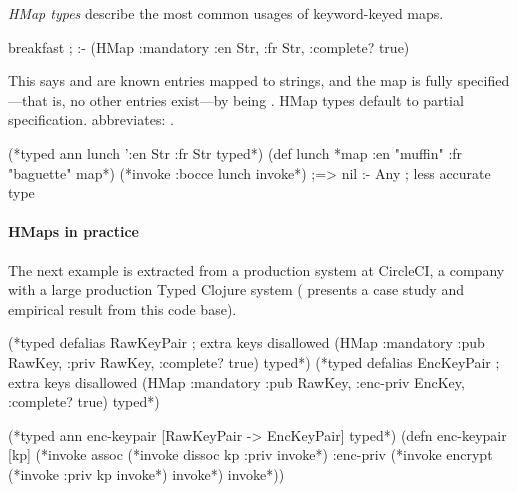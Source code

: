 \emph{HMap types} describe the most common usages of
keyword-keyed maps.

\begin{cljlisting}
breakfast ; :- (HMap :mandatory {:en Str, :fr Str}, :complete? true)
\end{cljlisting}

This says
 and  are known entries mapped to strings,
and the map is fully specified---that is, no other entries exist---by  being .
%
HMap types default to partial specification.
 abbreviates:
.

%
\begin{exmp}
\begin{cljlisting}
(*typed ann lunch '{:en Str :fr Str} typed*)
(def lunch {*map :en "muffin" :fr "baguette" map*})
(*invoke :bocce lunch invoke*) ;=> nil :- Any ; less accurate type
\end{cljlisting}
\label{example:lunchpartial}
\end{exmp}

\paragraph{HMaps in practice} The next example is extracted from a production system at CircleCI,
a company with a large production Typed Clojure system
( presents a case study and empirical
result from this code base).


\begin{minipage}{\linewidth}
\begin{exmp}
\begin{cljlisting}
(*typed defalias RawKeyPair ; extra keys disallowed
  (HMap :mandatory {:pub RawKey, :priv RawKey}, 
        :complete? true) typed*)
(*typed defalias EncKeyPair ; extra keys disallowed
  (HMap :mandatory {:pub RawKey, :enc-priv EncKey}, :complete? true) typed*)

(*typed ann enc-keypair [RawKeyPair -> EncKeyPair] typed*)
(defn enc-keypair [kp]
  (*invoke assoc (*invoke dissoc kp :priv invoke*) :enc-priv (*invoke encrypt (*invoke :priv kp invoke*) invoke*) invoke*))
\end{cljlisting}
\label{example:circleci}
\end{exmp}
\end{minipage}
%
%

